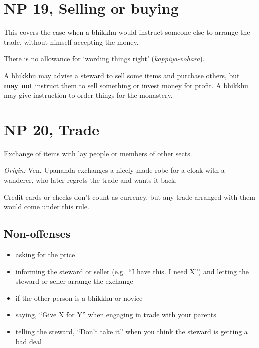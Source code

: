\section{NP 19, Selling or buying}

This covers the case when a bhikkhu would instruct someone else to
arrange the trade, without himself accepting the money.

There is no allowance for `wording things right'
(\emph{kappiya-vohāra}).

A bhikkhu may advise a steward to sell some items and purchase others,
but \textbf{may not} instruct them to sell something or invest money for
profit. A bhikkhu may give instruction to order things for the
monastery.

\section{NP 20, Trade}

Exchange of items with lay people or members of other sects.

\emph{Origin:} Ven. Upananda exchanges a nicely made robe for a cloak
with a wanderer, who later regrets the trade and wants it back.

Credit cards or checks don't count as currency, but any trade arranged
with them would come under this rule.

\enlargethispage*{\baselineskip}

\subsection{Non-offenses}

\begin{itemize}
\tightlist
\item
  asking for the price
\item
  informing the steward or seller (e.g.~``I have this. I need X'') and
  letting the steward or seller arrange the exchange
\item
  if the other person is a bhikkhu or novice
\item
  saying, ``Give X for Y'' when engaging in trade with your parents
\item
  telling the steward, ``Don't take it'' when you think the steward is
  getting a bad deal
\end{itemize}


